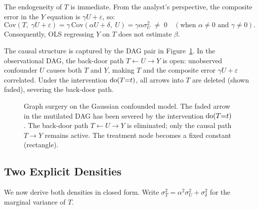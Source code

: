 \documentclass[master.tex]{subfiles}
\begin{document}
The endogeneity of $T$ is immediate.  From the analyst's perspective, the
composite error in the $Y$ equation is $\gamma U + \varepsilon$, so:
\[
  \mathrm{Cov}(T,\; \gamma U + \varepsilon)
  = \gamma\,\mathrm{Cov}(\alpha U + \delta,\; U)
  = \gamma\alpha\sigma_U^2 \;\neq\; 0
  \quad (\text{when } \alpha \neq 0 \text{ and } \gamma \neq 0).
\]
Consequently, OLS regressing $Y$ on $T$ does not estimate $\beta$.

The causal structure is captured by the DAG pair in Figure~\ref{w1:fig:surgery}.
In the observational DAG, the back-door path $T \leftarrow U \to Y$ is open:
unobserved confounder $U$ causes both $T$ and $Y$, making $T$ and the
composite error $\gamma U + \varepsilon$ correlated.  Under the intervention
$\mathrm{do}(T{=}t)$, all arrows into $T$ are deleted (shown faded), severing
the back-door path.

\begin{figure}[h]
\centering
{}
\caption{Graph surgery on the Gaussian confounded model.  The faded arrow
in the mutilated DAG has been severed by the intervention $\mathrm{do}(T{=}t)$.
The back-door path $T \leftarrow U \to Y$ is eliminated; only the causal
path $T \to Y$ remains active.  The treatment node becomes a fixed constant
(rectangle).}
\label{w1:fig:surgery}
\end{figure}

\subsection{Two Explicit Densities}

We now derive both densities in closed form.  Write $\sigma_T^2 =
\alpha^2\sigma_U^2 + \sigma_\delta^2$ for the marginal variance of $T$.
\end{document}
